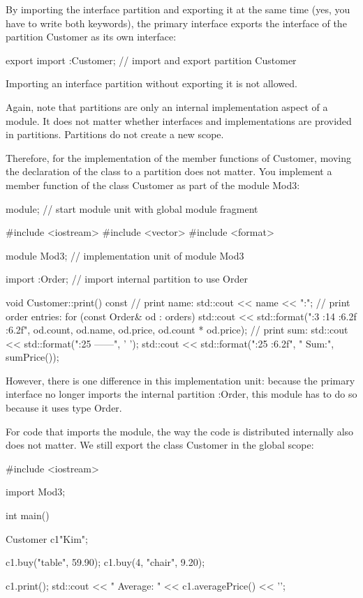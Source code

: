 By importing the interface partition and exporting it at the same time (yes, you have to write both keywords), the primary interface exports the interface of the partition Customer as its own interface:

\begin{cpp}
export import :Customer; // import and export partition Customer
\end{cpp}

Importing an interface partition without exporting it is not allowed.

Again, note that partitions are only an internal implementation aspect of a module. It does not matter whether interfaces and implementations are provided in partitions. Partitions do not create a new scope.

Therefore, for the implementation of the member functions of Customer, moving the declaration of the class to a partition does not matter. You implement a member function of the class Customer as part of the module Mod3:


\begin{cpp}
module; // start module unit with global module fragment

#include <iostream>
#include <vector>
#include <format>

module Mod3; // implementation unit of module Mod3

import :Order; // import internal partition to use Order

void Customer::print() const
{
	// print name:
	std::cout << name << ":\n";
	// print order entries:
	for (const Order& od : orders) {
		std::cout << std::format("{:3} {:14} {:6.2f} {:6.2f}\n",
								   od.count, od.name, od.price, od.count * od.price);
	}
	// print sum:
	std::cout << std::format("{:25} ------\n", ' ');
	std::cout << std::format("{:25} {:6.2f}\n", " Sum:", sumPrice());
}
\end{cpp}

However, there is one difference in this implementation unit: because the primary interface no longer imports the internal partition :Order, this module has to do so because it uses type Order.

For code that imports the module, the way the code is distributed internally also does not matter. We still export the class Customer in the global scope:


\begin{cpp}
#include <iostream>

import Mod3;

int main()
{
	Customer c1{"Kim"};
	
	c1.buy("table", 59.90);
	c1.buy(4, "chair", 9.20);
	
	c1.print();
	std::cout << " Average: " << c1.averagePrice() << '\n';
}
\end{cpp}



